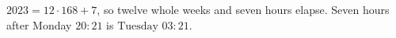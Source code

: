 $2023=12\cdot168+7$, so twelve whole weeks and seven hours elapse. Seven hours after Monday $20{:}21$ is $\boxed{\text{Tuesday }03{:}21}$.
